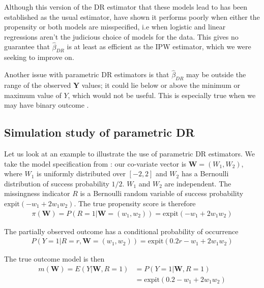 \documentclass[12pt,twoside]{article}
\newcommand{\expit}{\text{expit}}
\begin{document}
Although this version of the DR estimator that these models lead to has been established as the usual estimator, \cite{kang} have shown it performs poorly when either the propensity or both models are misspecified, i.e when logistic and linear regressions aren't the judicious choice of models for the data. This gives no guarantee that $\hat\beta_{DR}$ is at least as efficient as the IPW estimator, which we were seeking to improve on.

Another issue with parametric DR estimators is that $\hat\beta_{DR}$ may be outside the range of the observed $\mathbf{Y}$ values; it could lie below or above the minimum or maximum value of $Y$, which would not be useful. This is especially true when we may have binary outcome \citep{vansteelandt}.

\subsection{Simulation study of parametric DR}
\label{para_model}

Let us look at an example to illustrate the use of parametric DR estimators. We take the model specification from \citet{benkeser2017}: our co-variate vector is $\mathbf{W} = (W_1, W_2)$, where $W_1$ is uniformly distributed over $[-2,2]$ and $W_2$ has a Bernoulli distribution of success probability $1/2$. $W_1$ and $W_2$ are independent. The missingness indicator $R$ is a Bernoulli random variable of success probability $\expit(-w_1 + 2w_1w_2)$. The true propensity score is therefore
\begin{align*}
    \pi(\mathbf{W}) = P(R = 1 |\mathbf{W} = (w_1,w_2)) = \expit(-w_1 + 2w_1w_2)
\end{align*}

The partially observed outcome has a conditional probability of occurrence 
\begin{align*}
    P(Y = 1|R = r,\mathbf{W} = (w_1, w_2)) = \expit(0.2r - w_1 + 2w_1w_2)
\end{align*}

The true outcome model is then 
\begin{align*}
    m(\mathbf{W}) = E(Y|\mathbf{W}, R=1) &= P(Y = 1|\mathbf{W}, R= 1) \\
    & = \expit(0.2 - w_1 + 2w_1w_2)
\end{align*}
\end{document}

